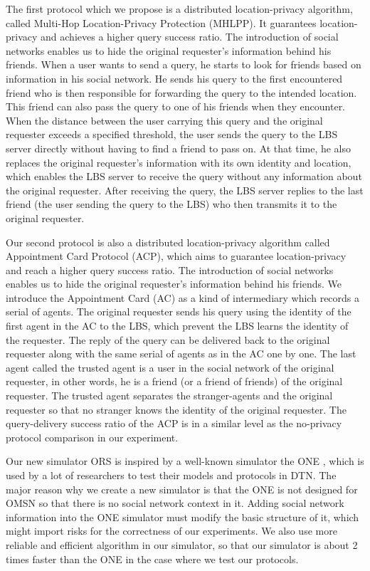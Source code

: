 The first protocol which we propose is a distributed location-privacy algorithm, called Multi-Hop Location-Privacy Protection (MHLPP). It guarantees location-privacy and achieves a higher query success ratio. The introduction of social networks enables us to hide the original requester's information behind his friends. When a user wants to send a query, he starts to look for friends based on information in his social network. He sends his query to the first encountered friend who is then responsible for forwarding the query to the intended location. This friend can also pass the query to one of his friends when they encounter. When the distance between the user carrying this query and the original requester exceeds a specified threshold, the user sends the query to the LBS server directly without having to find a friend to pass on. At that time, he also replaces the original requester's information with its own identity and location, which enables the LBS server to receive the query without any information about the original requester. After receiving the query, the LBS server replies to the last friend (the user sending the query to the LBS) who then transmits it to the original requester.

Our second protocol is also a distributed location-privacy algorithm called Appointment Card Protocol (ACP), which aims to guarantee location-privacy and reach a higher query success ratio. The introduction of social networks enables us to hide the original requester's information behind his friends. We introduce the Appointment Card (AC) as a kind of intermediary which records a serial of agents. The original requester sends his query using the identity of the first agent in the AC to the LBS, which prevent the LBS learns the identity of the requester. The reply of the query can be delivered back to the original requester along with the same serial of agents as in the AC one by one. The last agent called the trusted agent is a user in the social network of the original requester, in other words, he is a friend (or a friend of friends) of the original requester. The trusted agent separates the stranger-agents and the original requester so that no stranger knows the identity of the original requester. The query-delivery success ratio of the ACP is in a similar level as the no-privacy protocol comparison in our experiment.

Our new simulator ORS is inspired by a well-known simulator the ONE \cite {C35}, which is used by a lot of researchers to test their models and protocols in DTN. The major reason why we create a new simulator is that the ONE is not designed for OMSN so that there is no social network context in it. Adding social network information into the ONE simulator must modify the basic structure of it, which might import risks for the correctness of our experiments. We also use more reliable and efficient algorithm in our simulator, so that our simulator is about 2 times faster than the ONE in the case where we test our protocols.


